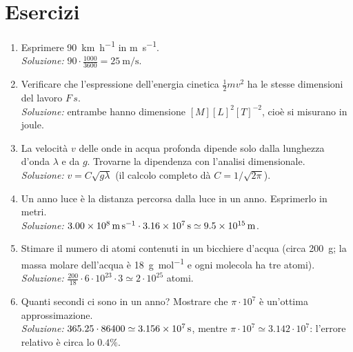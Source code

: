 \section{Esercizi}
\begin{enumerate}
  \item Esprimere \SI{90}{\kilo\meter\per\hour} in \si{\meter\per\second}.\\
  \emph{Soluzione:} $90\cdot\frac{1000}{3600}=\SI{25}{\meter\per\second}$.
  \item Verificare che l'espressione dell'energia cinetica $\frac12 mv^2$ ha le stesse dimensioni del lavoro $F\,s$.\\
  \emph{Soluzione:} entrambe hanno dimensione $[M][L]^2[T]^{-2}$, cioè si misurano in joule.
  \item La velocità $v$ delle onde in acqua profonda dipende solo dalla lunghezza d'onda $\lambda$ e da $g$. Trovarne la dipendenza con l'analisi dimensionale.\\
  \emph{Soluzione:} $v=C\sqrt{g\lambda}$ (il calcolo completo dà $C=1/\sqrt{2\pi}$).
  \item Un anno luce è la distanza percorsa dalla luce in un anno. Esprimerlo in metri.\\
  \emph{Soluzione:} $\SI{3.00E8}{\meter\per\second}\cdot\SI{3.16E7}{\second}\simeq\SI{9.5E15}{\meter}$.
  \item Stimare il numero di atomi contenuti in un bicchiere d'acqua (circa \SI{200}{\gram}; la massa molare dell'acqua è \SI{18}{\gram\per\mole} e ogni molecola ha tre atomi).\\
  \emph{Soluzione:} $\frac{200}{18}\cdot 6\cdot10^{23}\cdot 3\simeq 2\cdot10^{25}$ atomi.
 \item Quanti secondi ci sono in un anno? Mostrare che $\pi\cdot10^7$ è un'ottima approssimazione.\\
 \emph{Soluzione:} $365.25\cdot 86400\simeq\SI{3.156E7}{\second}$, mentre $\pi\cdot10^7\simeq 3.142\cdot10^7$: l'errore relativo è circa lo $0.4\%$.
\end{enumerate}
